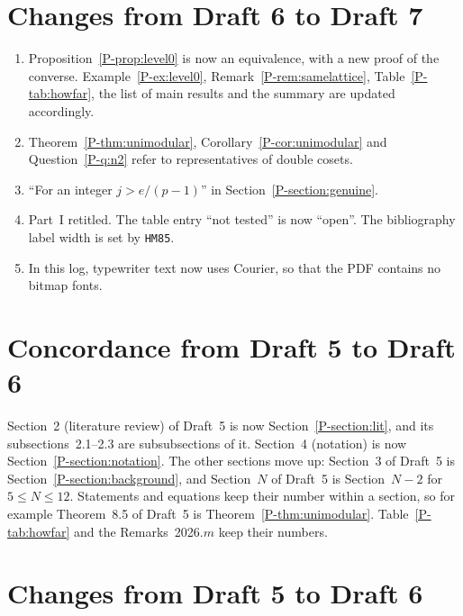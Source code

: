 \documentclass[12pt,letterpaper]{amsart}
\begin{document}
\section{Changes from Draft 6 to Draft 7}

\begin{enumerate}[leftmargin=1.5em]
\item Proposition~\ref{P-prop:level0} is now an equivalence, with a new
proof of the converse. Example~\ref{P-ex:level0},
Remark~\ref{P-rem:samelattice}, Table~\ref{P-tab:howfar}, the list of
main results and the summary are updated accordingly.
\item Theorem~\ref{P-thm:unimodular}, Corollary~\ref{P-cor:unimodular}
and Question~\ref{P-q:n2} refer to representatives of double cosets.
\item ``For an integer $j>e/(p-1)$'' in Section~\ref{P-section:genuine}.
\item Part~I retitled. The table entry ``not tested'' is now ``open''.
The bibliography label width is set by \texttt{HM85}.
\item In this log, typewriter text now uses Courier, so that the PDF
contains no bitmap fonts.
\end{enumerate}

\section{Concordance from Draft 5 to Draft 6}
\label{sec:conc56}

Section~2 (literature review) of Draft~5 is now
Section~\ref{P-section:lit}, and its subsections~2.1--2.3 are
subsubsections of it. Section~4 (notation) is now
Section~\ref{P-section:notation}. The other sections move up: Section~3
of Draft~5 is Section~\ref{P-section:background}, and Section~$N$ of
Draft~5 is Section~$N-2$ for $5\leq N\leq 12$. Statements and equations
keep their number within a section, so for example Theorem~8.5 of
Draft~5 is Theorem~\ref{P-thm:unimodular}. Table~\ref{P-tab:howfar} and
the Remarks~2026.$m$ keep their numbers.

\section{Changes from Draft 5 to Draft 6}
\end{document}
